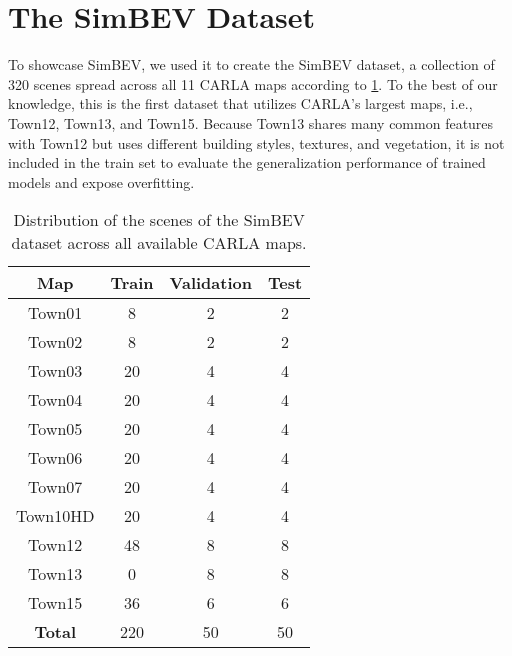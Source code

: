 \section{The SimBEV Dataset} \label{sec:simbev-dataset}

To showcase SimBEV, we used it to create the SimBEV dataset, a collection of 320 scenes spread across all 11 CARLA maps according to \cref{table:simbev-split}. To the best of our knowledge, this is the first dataset that utilizes CARLA's largest maps, i.e., Town12, Town13, and Town15. Because Town13 shares many common features with Town12 but uses different building styles, textures, and vegetation, it is not included in the train set to evaluate the generalization performance of trained models and expose overfitting.

\begin{table}[t]
    \centering
    \footnotesize
    \begin{tabular}{c c c c}
        \toprule
        \textbf{Map} & \textbf{Train} & \textbf{Validation} & \textbf{Test} \\
        \toprule
        Town01 & 8 & 2 & 2 \\
        Town02 & 8 & 2 & 2 \\
        Town03 & 20 & 4 & 4 \\
        Town04 & 20 & 4 & 4 \\
        Town05 & 20 & 4 & 4 \\
        Town06 & 20 & 4 & 4 \\
        Town07 & 20 & 4 & 4 \\
        Town10HD & 20 & 4 & 4 \\
        Town12 & 48 & 8 & 8 \\
        Town13 & 0 & 8 & 8 \\
        Town15 & 36 & 6 & 6 \\
        \bottomrule
        \textbf{Total} & 220 & 50 & 50 \\
        \bottomrule
    \end{tabular}
    \setlength{\abovecaptionskip}{4 pt}
    \setlength{\belowcaptionskip}{-8 pt}
    \caption{Distribution of the scenes of the SimBEV dataset across all available CARLA maps.} \label{table:simbev-split}
\end{table}
\setlength{\lineskip}{1pt}
